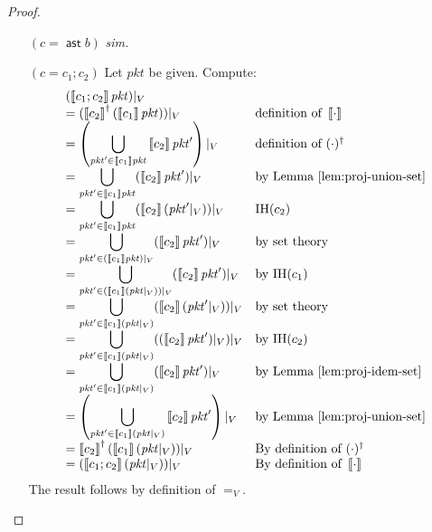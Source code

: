 \documentclass{article}
\newcommand{\pkt}{\mathit{pkt}}
\newcommand{\denote}[1]{\left\llbracket#1\right\rrbracket}
\newcommand{\assert}{\mathop{\mathsf{ast}}}
\begin{document}
\begin{proof}
\begin{enumerate}[align=left]
  \item[$(c = \assert b)$] \textit{sim.}
  \item[$(c = c_1;c_2)$] Let $\pkt$ be given. Compute:
    \[\begin{array}{>{\displaystyle}ll}
    (\denote{c_1;c_2}\pkt)|_V \\
    = (\denote{c_2}^\dagger(\denote{c_1}\pkt))|_V
    & \text{definition of }\denote\cdot \\
    = \left(\bigcup_{\pkt' \in \denote{c_1} \pkt} \denote{c_2}\pkt'\right)|_V
    & \text{definition of }(\cdot)^\dagger \\
    = \bigcup_{\pkt' \in \denote{c_1} \pkt} (\denote{c_2}\pkt')|_V
    & \text{by Lemma~\ref{lem:proj-union-set}} \\
    = \bigcup_{\pkt' \in \denote{c_1}\pkt} (\denote{c_2}(\pkt'|_V))|_V
    & \text{IH}(c_2)  \\
    =\bigcup_{\pkt' \in (\denote{c_1}\pkt)|_V} (\denote{c_2} \pkt')|_V
    & \text{by set theory} \\
    = \bigcup_{\pkt' \in (\denote{c_1}(\pkt|_V))|_V} (\denote{c_2} \pkt')|_V
    & \text{by IH}(c_1) \\
    = \bigcup_{\pkt' \in \denote{c_1}(\pkt|_V)} (\denote{c_2} (\pkt'|_V))|_V
    & \text{by set theory} \\
    = \bigcup_{\pkt' \in \denote{c_1}(\pkt|_V)} ((\denote{c_2} \pkt')|_V)|_V
    & \text{by IH}(c_2) \\
    = \bigcup_{\pkt' \in \denote{c_1}(\pkt|_V)} (\denote{c_2} \pkt')|_V
    & \text{by Lemma~\ref{lem:proj-idem-set}} \\
    = \left(\bigcup_{\pkt' \in \denote{c_1}(\pkt|_V)} \denote{c_2}\pkt'\right)|_V
    & \text{by Lemma~\ref{lem:proj-union-set}} \\
    = \denote{c_2}^\dagger(\denote{c_1}(\pkt|_V))|_V
    & \text{By definition of }(\cdot)^\dagger\\
    = (\denote{c_1;c_2}(\pkt|_V))|_V
    & \text{By definition of }\denote\cdot
    \end{array}\]
    The result follows by definition of $=_V$.


\end{enumerate}
\end{proof}
\end{document}
